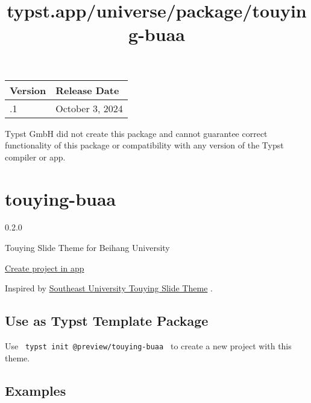 \begin{longtable}[]{@{}ll@{}}
\toprule\noalign{}
Version & Release Date \\
\midrule\noalign{}
\endhead
\bottomrule\noalign{}
\endlastfoot
0.1.1 & October 3, 2024 \\
\end{longtable}

Typst GmbH did not create this package and cannot guarantee correct
functionality of this package or compatibility with any version of the
Typst compiler or app.


\title{typst.app/universe/package/touying-buaa}

\label{banner}
\label{template-thumbnail}

\section{touying-buaa}\label{touying-buaa}

{ 0.2.0 }

Touying Slide Theme for Beihang University

\href{/app?template=touying-buaa&version=0.2.0}{Create project in app}

\label{readme}
Inspired by
\href{https://github.com/QuadnucYard/touying-theme-seu}{Southeast
University Touying Slide Theme} .

\subsection{Use as Typst Template
Package}\label{use-as-typst-template-package}

Use \texttt{\ typst\ init\ @preview/touying-buaa\ } to create a new
project with this theme.

\begin{Shaded}
\begin{Highlighting}[]
\end{Highlighting}
\end{Shaded}

\subsection{Examples}\label{examples}

